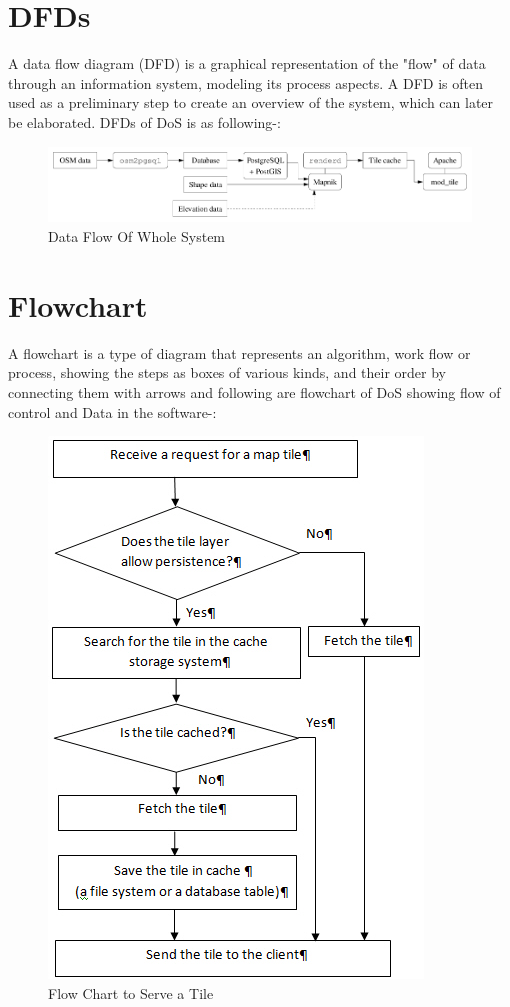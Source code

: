 \section{DFDs}
A data flow diagram (DFD) is a graphical representation of the "flow" of data through an information system, modeling its process aspects. A DFD is often used as a preliminary step to create an overview of the system, which can later be elaborated. DFDs of DoS is as following-:

\begin{figure}[ht]
\centering
\includegraphics[scale=0.6]{input/images/osmserv.png}
\caption{Data Flow Of Whole System}
\end{figure}
\section{Flowchart}
A flowchart is a type of diagram that represents an algorithm, work flow or process, showing the steps as boxes of various kinds, and their order by connecting them with arrows
and following are flowchart of DoS showing flow of control and Data in the software-:
\begin{figure}[ht]
\centering
\includegraphics[scale=0.9]{input/images/fetch.jpg}
\caption{Flow Chart to Serve a Tile}
\end{figure}
\hspace{-1.7em}



